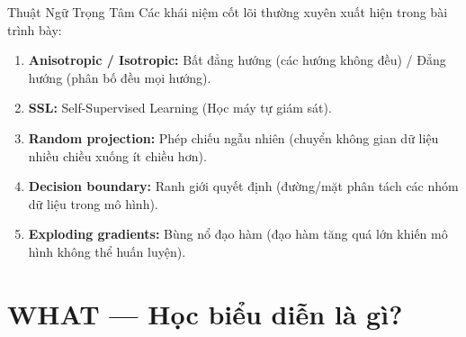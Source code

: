\documentclass[aspectratio=169,9pt]{beamer}
\begin{document}
\begin{frame}{Thuật Ngữ Trọng Tâm}
  \vspace{0.3em}
  Các khái niệm cốt lõi thường xuyên xuất hiện trong bài trình bày:
  
  \vspace{0.6em}
  \begin{enumerate}\small\setlength\itemsep{1em}
    \item \textbf{\color{mprimary}Anisotropic / Isotropic:} Bất đẳng hướng (các hướng không đều) / Đẳng hướng (phân bố đều mọi hướng).
    \item \textbf{\color{mprimary}SSL:} Self-Supervised Learning (Học máy tự giám sát).
    \item \textbf{\color{mprimary}Random projection:} Phép chiếu ngẫu nhiên (chuyển không gian dữ liệu nhiều chiều xuống ít chiều hơn).
    \item \textbf{\color{mprimary}Decision boundary:} Ranh giới quyết định (đường/mặt phân tách các nhóm dữ liệu trong mô hình).
    \item \textbf{\color{mprimary}Exploding gradients:} Bùng nổ đạo hàm (đạo hàm tăng quá lớn khiến mô hình không thể huấn luyện).
  \end{enumerate}
\end{frame}


\section{WHAT — Học biểu diễn là gì?}
\end{document}
